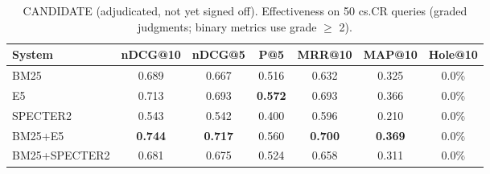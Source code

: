 \begin{table}[t]
\centering
\small
\caption{CANDIDATE (adjudicated, not yet signed off). Effectiveness on 50 cs.CR queries (graded judgments; binary metrics use grade $\geq$ 2).}
\label{tab:main}
\begin{tabular}{lcccccc}
\toprule
System & nDCG@10 & nDCG@5 & P@5 & MRR@10 & MAP@10 & Hole@10 \\
\midrule
BM25 & 0.689 & 0.667 & 0.516 & 0.632 & 0.325 & 0.0\% \\
E5 & 0.713 & 0.693 & \textbf{0.572} & 0.693 & 0.366 & 0.0\% \\
SPECTER2 & 0.543 & 0.542 & 0.400 & 0.596 & 0.210 & 0.0\% \\
BM25+E5 & \textbf{0.744} & \textbf{0.717} & 0.560 & \textbf{0.700} & \textbf{0.369} & 0.0\% \\
BM25+SPECTER2 & 0.681 & 0.675 & 0.524 & 0.658 & 0.311 & 0.0\% \\
\bottomrule
\end{tabular}
\end{table}
